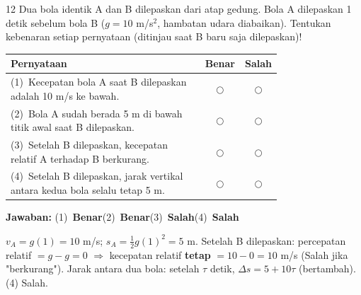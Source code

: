 \documentclass[11pt]{article}
\newcommand{\jawaban}[1]{%
  \noindent\colorbox{gold!30}{\parbox{\dimexpr\linewidth-2\fboxsep\relax}{%
    \textbf{Jawaban:} #1}}\par\smallskip}
\begin{document}
\begin{soal}{12}  %
Dua bola identik A dan B dilepaskan dari atap gedung. Bola A
dilepaskan 1 detik sebelum bola B ($g=10$ m/s$^2$, hambatan
udara diabaikan). Tentukan kebenaran setiap pernyataan (ditinjau
saat B baru saja dilepaskan)!

\par\smallskip
{\renewcommand{\arraystretch}{1.4}%
\begin{tabular}{@{}p{0.76\linewidth}cc@{}}
\hline
\textbf{Pernyataan} & \textbf{Benar} & \textbf{Salah}\\
\hline
(1)~Kecepatan bola A saat B dilepaskan adalah 10 m/s ke bawah.
  & $\bigcirc$ & $\bigcirc$\\
(2)~Bola A sudah berada 5 m di bawah titik awal saat B dilepaskan.
  & $\bigcirc$ & $\bigcirc$\\
(3)~Setelah B dilepaskan, kecepatan relatif A terhadap B berkurang.
  & $\bigcirc$ & $\bigcirc$\\
(4)~Setelah B dilepaskan, jarak vertikal antara kedua bola selalu
    tetap 5 m.
  & $\bigcirc$ & $\bigcirc$\\
\hline
\end{tabular}}
\end{soal}
\begin{pembox}
\jawaban{(1)~\textbf{Benar}\quad(2)~\textbf{Benar}\quad(3)~\textbf{Salah}\quad(4)~\textbf{Salah}}
$v_A = g(1)=10$ m/s; $s_A=\tfrac{1}{2}g(1)^2=5$ m.
Setelah B dilepaskan: percepatan relatif $= g-g = 0$ $\Rightarrow$ kecepatan relatif \textbf{tetap} $= 10-0=10$ m/s (Salah jika "berkurang").
Jarak antara dua bola: setelah $\tau$ detik, $\Delta s = 5 + 10\tau$ (bertambah). (4) Salah.
\end{pembox}
\end{document}
